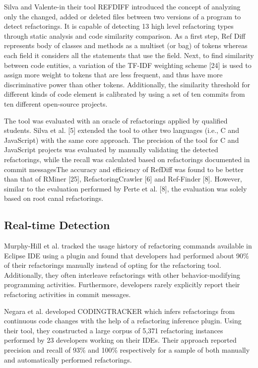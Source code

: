 \documentclass[letterpaper,12pt,onecolumn,final]{report}
\begin{document}
Silva and Valente\cite{Silva2017}-in their tool REFDIFF introduced the concept of analyzing only the changed, added or deleted files between two versions of a program to detect refactorings. It is capable of detecting 13 high level refactoring types through static analysis and code similarity comparison.  As a first step, Ref Diff represents body of classes and methods as a multiset (or bag) of tokens whereas each field it considers all the statements that use the field. Next, to find similarity between code entities, a variation of the TF-IDF weighting scheme [24] is used  to assign more weight to tokens that are less frequent, and thus have more discriminative power than other tokens. Additionally, the similarity threshold for different kinds of code element is calibrated by using  a set of ten commits from ten different open-source projects.

The tool was evaluated
with an oracle of refactorings applied by qualified students.
Silva et al. [5] extended the tool to other two languages (i.e.,
C and JavaScript) with the same core approach. The precision
of the tool for C and JavaScript projects was evaluated by
manually validating the detected refactorings, while the recall
was calculated based on refactorings documented in commit
messagesThe accuracy and efficiency
of RefDiff was found to be better than that of RMiner [25],
RefactoringCrawler [6] and Ref-Finder [8]. However, similar
to the evaluation performed by Perte et al. [8], the evaluation
was solely based on root canal refactorings.


\subsection{Real-time Detection}
Murphy-Hill et al. \cite{MurphyHill2012} tracked the usage history of refactoring commands available in Eclipse IDE using a plugin and found that developers had performed about 90\% of their refactorings manually instead of opting for the refactoring tool. Additionally, they often interleave refactorings with other behavior-modifying programming activities. Furthermore, developers rarely explicitly report their refactoring activities in commit messages.

Negara et al. \cite{Negara2013} developed CODINGTRACKER which infers refactorings from continuous code changes with the help of a refactoring inference plugin. Using their tool, they constructed a large corpus of 5,371 refactoring instances performed by 23 developers working on their IDEs. Their approach reported precision and recall of 93\% and 100\% respectively for a sample of both manually and automatically performed refactorings.
\end{document}
